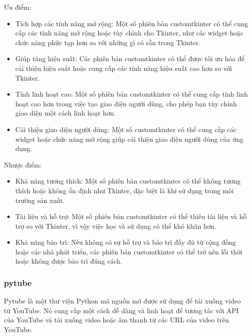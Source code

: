 \documentclass{article} %
\begin{document}
Ưu điểm:
\begin{itemize}
    \item Tích hợp các tính năng mở rộng: Một số phiên bản customtkinter có thể cung cấp các tính năng mở rộng hoặc tùy chỉnh cho Tkinter, như các widget hoặc chức năng phức tạp hơn so với những gì có sẵn trong Tkinter.
    \item Giúp tăng hiệu suất: Các phiên bản customtkinter có thể được tối ưu hóa để cải thiện hiệu suất hoặc cung cấp các tính năng hiệu suất cao hơn so với Tkinter.
    \item Tính linh hoạt cao: Một số phiên bản customtkinter có thể cung cấp tính linh hoạt cao hơn trong việc tạo giao diện người dùng, cho phép bạn tùy chỉnh giao diện một cách linh hoạt hơn.
    \item Cải thiện giao diện người dùng: Một số customtkinter có thể cung cấp các widget hoặc chức năng mở rộng giúp cải thiện giao diện người dùng của ứng dụng.
\end{itemize}
\hspace{0.0em} Nhược điểm:
\begin{itemize}
    \item Khả năng tương thích: Một số phiên bản customtkinter có thể không tương thích hoặc không ổn định như Tkinter, đặc biệt là khi sử dụng trong môi trường sản xuất.
    \item Tài liệu và hỗ trợ: Một số phiên bản customtkinter có thể thiếu tài liệu và hỗ trợ so với Tkinter, vì vậy việc học và sử dụng có thể khó khăn hơn.
    \item Khả năng bảo trì: Nếu không có sự hỗ trợ và bảo trì đầy đủ từ cộng đồng hoặc các nhà phát triển, các phiên bản customtkinter có thể trở nên lỗi thời hoặc không được bảo trì đúng cách.
\end{itemize}

\subsubsection{pytube}
Pytube là một thư viện Python mã nguồn mở được sử dụng để tải xuống video từ YouTube. Nó cung cấp một cách dễ dàng và linh hoạt để tương tác với API của YouTube và tải xuống video hoặc âm thanh từ các URL của video trên YouTube.
\end{document}
